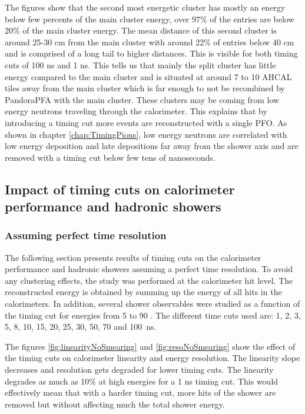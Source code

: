 The figures show that the second most energetic cluster has mostly an energy below few percents of the main cluster energy, over 97\% of the entries are below 20\% of the main cluster energy. The mean distance of this second cluster is around 25-30 cm from the main cluster with around 22\% of entries below 40 cm and is comprised of a long tail to higher distances. This is visible for both timing cuts of 100 ns and 1 ns. This tells us that mainly the split cluster has little energy compared to the main cluster and is situated at around 7 to 10 AHCAL tiles away from the main cluster which is far enough to not be recombined by PandoraPFA with the main cluster. These clusters may be coming from low energy neutrons traveling through the calorimeter. This explains that by introducing a timing cut more events are reconstructed with a single PFO. As shown in chapter \ref{chap:TimingPions}, low energy neutrons are correlated with low energy deposition and late depositions far away from the shower axis and are removed with a timing cut below few tens of nanoseconds.

\subsection{Impact of timing cuts on calorimeter performance and hadronic showers}

\subsubsection{Assuming perfect time resolution}

The following section presents results of timing cuts on the calorimeter performance and hadronic showers assuming a perfect time resolution. To avoid any clustering effects, the study was performed at the calorimeter hit level. The reconstructed energy is obtained by summing up the energy of all hits in the calorimeters. In addition, several shower observables were studied as a function of the timing cut for energies from 5 \GeV to 90 \GeV \kzeroL. The different time cuts used are: 1, 2, 3, 5, 8, 10, 15, 20, 25, 30, 50, 70 and \SI{100}{\nano\second}.

The figures \ref{fig:linearityNoSmearing} and \ref{fig:resoNoSmearing} show the effect of the timing cuts on calorimeter linearity and energy resolution. The linearity slope decreases and resolution gets degraded for lower timing cuts. The linearity degrades as much as 10\% at high energies for a 1 ns timing cut. This would effectively mean that with a harder timing cut, more hits of the shower are removed but without affecting much the total shower energy.

